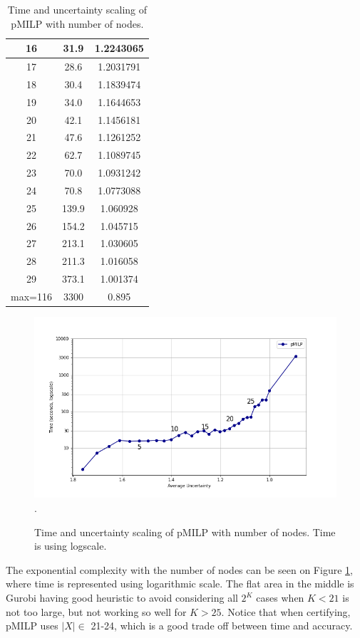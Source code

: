 \begin{table}[t!]
\begin{subtable}[b]{0.45\textwidth}
\begin{tabular}{|c|c|c|}
		\hline	16 & 31.9 & 1.2243065\\
		\hline	17 & 28.6 & 1.2031791\\
		\hline	18 & 30.4 & 1.1839474\\
		\hline	19 & 34.0 & 1.1644653\\
		\hline	20 & 42.1 & 1.1456181\\
		\hline	21 & 47.6 & 1.1261252\\
		\hline	22 & 62.7 & 1.1089745\\
		\hline	23 & 70.0 & 1.0931242\\
		\hline	24 & 70.8 & 1.0773088\\
		\hline	25 & 139.9 & 1.060928\\
		\hline	26 & 154.2 & 1.045715\\
		\hline	27 & 213.1 & 1.030605 \\
		\hline	28 & 211.3 & 1.016058\\
		\hline	29 & 373.1 & 1.001374\\
		\hline max=116 & 3300 & 0.895\\ 
		\hline		
	  \end{tabular}
     \end{subtable}
	  \caption{Time and uncertainty scaling of pMILP with number of nodes.}
    	\label{table14}
\end{table}


\begin{figure}[h!]
	\vspace*{-0.8cm}
	\includegraphics[scale=0.6]{Layer3_comparison}.
	\caption{Time and uncertainty scaling of pMILP with number of nodes.
	Time is using logscale.}
	\label{fig3}
\end{figure}



The exponential complexity with the number of nodes can be seen on Figure \ref{fig3}, where time is represented using logarithmic scale. The flat area in the middle is Gurobi having good heuristic to avoid considering all $2^K$ cases when $K<21$ is not too large, but not working so well for $K>25$. Notice that when certifying, pMILP uses $|X| \in$ 21-24, which is a good trade off between time and accuracy.

